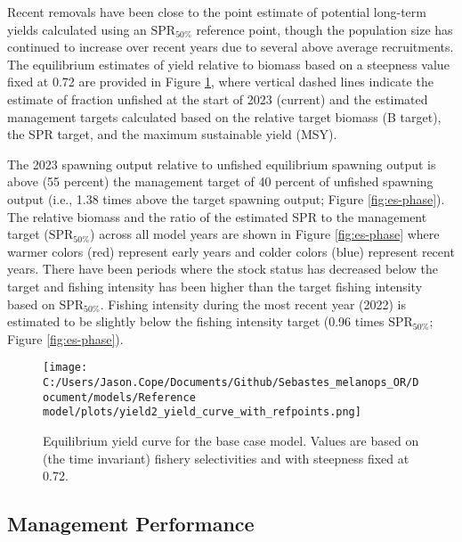 \documentclass[11pt,
  english,
  letterpaper,
]{article}
\begin{document}
Recent removals have been close to the point estimate of potential long-term yields calculated using an \(\text{SPR}_{50\%}\) reference point, though the population size has continued to increase over recent years due to several above average recruitments. The equilibrium estimates of yield relative to biomass based on a steepness value fixed at 0.72 are provided in Figure \ref{fig:es-yield}, where vertical dashed lines indicate the estimate of fraction unfished at the start of 2023 (current) and the estimated management targets calculated based on the relative target biomass (B target), the SPR target, and the maximum sustainable yield (MSY).

The 2023 spawning output relative to unfished equilibrium spawning output is above (55 percent) the management target of 40 percent of unfished spawning output (i.e., 1.38 times above the target spawning output; Figure \ref{fig:es-phase}). The relative biomass and the ratio of the estimated SPR to the management target (\(\text{SPR}_{50\%}\)) across all model years are shown in Figure \ref{fig:es-phase} where warmer colors (red) represent early years and colder colors (blue) represent recent years. There have been periods where the stock status has decreased below the target and fishing intensity has been higher than the target fishing intensity based on \(\text{SPR}_{50\%}\). Fishing intensity during the most recent year (2022) is estimated to be slightly below the fishing intensity target (0.96 times \(\text{SPR}_{50\%}\); Figure \ref{fig:es-phase}).

\begin{figure}
\centering
\texttt{[image: C:/Users/Jason.Cope/Documents/Github/Sebastes\_melanops\_OR/Document/models/Reference model/plots/yield2\_yield\_curve\_with\_refpoints.png]}
\caption{Equilibrium yield curve for the base case model. Values are based on (the time invariant) fishery selectivities and with steepness fixed at 0.72.\label{fig:es-yield}}
\end{figure}

\clearpage



\clearpage

\hypertarget{management-performance}{%
\subsection*{Management Performance}\label{management-performance}}
\end{document}

